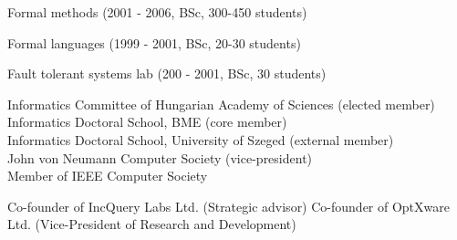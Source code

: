 \documentclass{xetexCV}
\begin{document}

Formal methods (2001 - 2006, BSc, 300-450 students)

 
Formal languages (1999 - 2001, BSc, 20-30 students)

Fault tolerant systems lab (200 - 2001, BSc, 30 students)


Informatics Committee of Hungarian Academy of Sciences (elected member)   \\
Informatics Doctoral School, BME (core member)   \\
Informatics Doctoral School, University of Szeged (external member)   \\
John von Neumann Computer Society (vice-president)  \\
Member of IEEE Computer Society 

Co-founder of IncQuery Labs Ltd. (Strategic advisor)  
Co-founder of OptXware Ltd. (Vice-President of Research and Development)  \\


% 
% 
% 
% 
% 
% 

% 
% 
% 
% 
% 
% 
% 
% 
\end{document}
